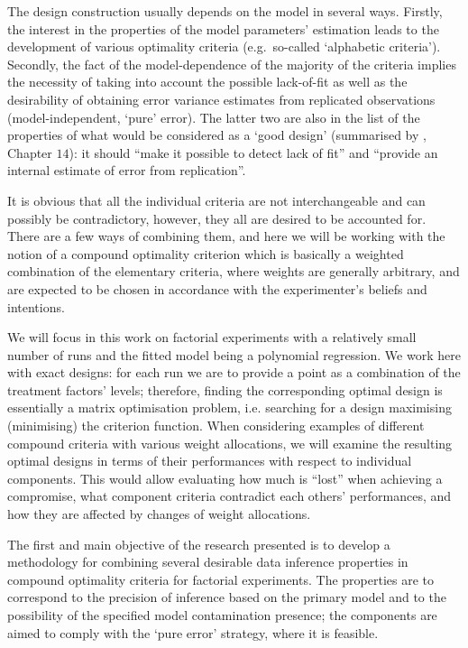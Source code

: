 \documentclass[11pt]{article}
\begin{document}
The design construction usually depends on the model in several ways. Firstly, the interest in the properties of the model parameters' estimation leads to the development of various optimality criteria (e.g.~so-called `alphabetic criteria'). Secondly, the fact of the model-dependence of the majority of the criteria implies the necessity of taking into account the possible lack-of-fit as well as the desirability of obtaining error variance estimates from replicated observations (model-independent, `pure' error). The latter two are also in the list of the properties of what would be considered as a `good design' (summarised by \cite{Box1987empirical}, Chapter $14$): it should ``make it possible to detect lack of fit'' and ``provide an internal estimate of error from replication''.

It is obvious that all the individual criteria are not interchangeable and can possibly be contradictory, however, they all are desired to be accounted for. There are a few ways of combining them, and here we will be working with the notion of a compound optimality criterion which is basically a weighted combination of the elementary criteria, where weights are generally arbitrary, and are expected to be chosen in accordance with the experimenter's beliefs and intentions. 

We will focus in this work on factorial experiments with a relatively small number of runs and the fitted model being a polynomial regression. We work here with exact designs: for each run we are to provide a point as a combination of the treatment factors' levels; therefore, finding the corresponding optimal design is essentially a matrix optimisation problem, i.e. searching for a design maximising (minimising) the criterion function. When considering examples of different compound criteria with various weight allocations, we will examine the resulting optimal designs in terms of their performances with respect to individual components. This would allow evaluating how much is ``lost'' when achieving a compromise, what component criteria contradict each others' performances, and how they are affected by changes of weight allocations.

The first and main objective of the research presented is to develop a methodology for combining several desirable data inference properties in compound optimality criteria for factorial experiments. The properties are to correspond to the precision of inference based on the primary model and to the possibility of the specified model contamination presence; the components are aimed to comply with the `pure error' strategy, where it is feasible.
\end{document}
